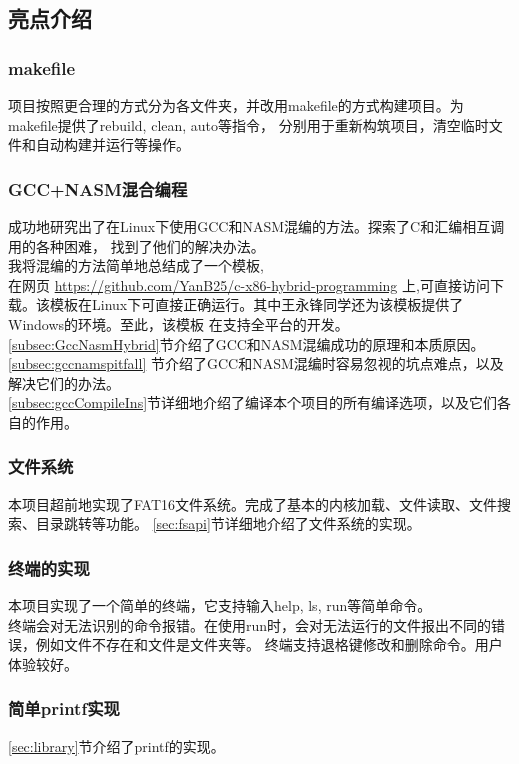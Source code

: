 \documentclass[a4paper]{article}
\begin{document}
    \subsection{亮点介绍}
    \subsubsection{makefile}
    项目按照更合理的方式分为各文件夹，并改用makefile的方式构建项目。为makefile提供了rebuild, clean, auto等指令，
    分别用于重新构筑项目，清空临时文件和自动构建并运行等操作。
    \subsubsection{GCC+NASM混合编程}
    成功地研究出了在Linux下使用GCC和NASM混编的方法。探索了C和汇编相互调用的各种困难，
    找到了他们的解决办法。\\

    我将混编的方法简单地总结成了一个模板,
    \\ 在网页 \url{https://github.com/YanB25/c-x86-hybrid-programming}
     上,可直接访问下载。该模板在Linux下可直接正确运行。其中王永锋同学还为该模板提供了Windows的环境。至此，该模板
     在支持全平台的开发。 \\

    \ref{subsec:GccNasmHybrid}节介绍了GCC和NASM混编成功的原理和本质原因。    \\
    \ref{subsec:gccnamspitfall} 节介绍了GCC和NASM混编时容易忽视的坑点难点，以及解决它们的办法。\\
    \ref{subsec:gccCompileIns}节详细地介绍了编译本个项目的所有编译选项，以及它们各自的作用。\\

    \subsubsection{文件系统}
    本项目超前地实现了FAT16文件系统。完成了基本的内核加载、文件读取、文件搜索、目录跳转等功能。
    \ref{sec:fsapi}节详细地介绍了文件系统的实现。
    \subsubsection{终端的实现}
    本项目实现了一个简单的终端，它支持输入help, ls, run等简单命令。\\
    
    终端会对无法识别的命令报错。在使用run时，会对无法运行的文件报出不同的错误，例如文件不存在和文件是文件夹等。
    终端支持退格键修改和删除命令。用户体验较好。
    \subsubsection{简单printf实现}
    \ref{sec:library}节介绍了printf的实现。
\end{document}
